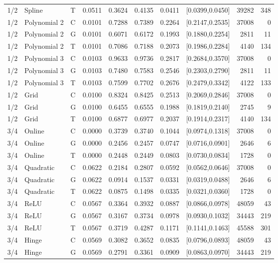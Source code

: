 \begin{longtable}{lllrrrrlrr}
1/2 & Spline & T & 0.0511 & 0.3624 & 0.4135 & 0.0411 & [0.0399,0.0450] & 39282 & 348 \\
1/2 & Polynomial 2 & C & 0.0101 & 0.7288 & 0.7389 & 0.2264 & [0.2147,0.2535] & 37008 & 0 \\
1/2 & Polynomial 2 & G & 0.0101 & 0.6071 & 0.6172 & 0.1993 & [0.1880,0.2254] & 2811 & 11 \\
1/2 & Polynomial 2 & T & 0.0101 & 0.7086 & 0.7188 & 0.2073 & [0.1986,0.2284] & 4140 & 134 \\
1/2 & Polynomial 3 & C & 0.0103 & 0.9633 & 0.9736 & 0.2817 & [0.2684,0.3570] & 37008 & 0 \\
1/2 & Polynomial 3 & G & 0.0103 & 0.7480 & 0.7583 & 0.2546 & [0.2303,0.2790] & 2811 & 11 \\
1/2 & Polynomial 3 & T & 0.0103 & 0.7599 & 0.7702 & 0.2676 & [0.2479,0.3342] & 4122 & 133 \\
1/2 & Grid & C & 0.0100 & 0.8324 & 0.8425 & 0.2513 & [0.2069,0.2846] & 37008 & 0 \\
1/2 & Grid & G & 0.0100 & 0.6455 & 0.6555 & 0.1988 & [0.1819,0.2140] & 2745 & 9 \\
1/2 & Grid & T & 0.0100 & 0.6877 & 0.6977 & 0.2037 & [0.1914,0.2317] & 4140 & 134 \\
3/4 & Online & C & 0.0000 & 0.3739 & 0.3740 & 0.1044 & [0.0974,0.1318] & 37008 & 0 \\
3/4 & Online & G & 0.0000 & 0.2456 & 0.2457 & 0.0747 & [0.0716,0.0901] & 2646 & 6 \\
3/4 & Online & T & 0.0000 & 0.2448 & 0.2449 & 0.0803 & [0.0730,0.0834] & 1728 & 0 \\
3/4 & Quadratic & C & 0.0622 & 0.2184 & 0.2807 & 0.0592 & [0.0562,0.0646] & 37008 & 0 \\
3/4 & Quadratic & G & 0.0622 & 0.0914 & 0.1537 & 0.0331 & [0.0319,0.0488] & 2646 & 6 \\
3/4 & Quadratic & T & 0.0622 & 0.0875 & 0.1498 & 0.0335 & [0.0321,0.0360] & 1728 & 0 \\
3/4 & ReLU & C & 0.0567 & 0.3364 & 0.3932 & 0.0887 & [0.0866,0.0978] & 48059 & 43 \\
3/4 & ReLU & G & 0.0567 & 0.3167 & 0.3734 & 0.0978 & [0.0930,0.1032] & 34443 & 219 \\
3/4 & ReLU & T & 0.0567 & 0.3719 & 0.4287 & 0.1171 & [0.1141,0.1463] & 45588 & 301 \\
3/4 & Hinge & C & 0.0569 & 0.3082 & 0.3652 & 0.0835 & [0.0796,0.0893] & 48059 & 43 \\
3/4 & Hinge & G & 0.0569 & 0.2791 & 0.3361 & 0.0909 & [0.0863,0.0970] & 34443 & 219 \\

\end{longtable}
